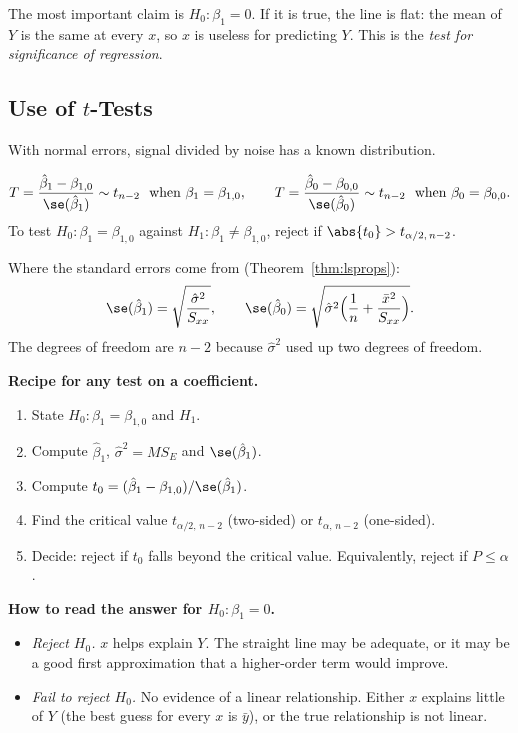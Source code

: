 The most important claim is $H_0:\beta_1=0$. If it is true, the line is flat: the mean of $Y$ is the same at every $x$, so $x$ is useless for predicting $Y$. This is the \emph{test for significance of regression}.

\subsection{Use of $t$-Tests}

With normal errors, signal divided by noise has a known distribution.

\begin{theorem}\label{thm:regt}
\[ T=\frac{\hat\beta_1-\beta_{1,0}}{\se(\hat\beta_1)}\sim t_{n-2}\ \text{ when }\beta_1=\beta_{1,0},\qquad T=\frac{\hat\beta_0-\beta_{0,0}}{\se(\hat\beta_0)}\sim t_{n-2}\ \text{ when }\beta_0=\beta_{0,0}. \]
To test $H_0:\beta_1=\beta_{1,0}$ against $H_1:\beta_1\ne\beta_{1,0}$, reject if $\abs{t_0}>t_{\alpha/2,\,n-2}$.
\end{theorem}

Where the standard errors come from (Theorem~\ref{thm:lsprops}):
\[ \se(\hat\beta_1)=\sqrt{\frac{\hat\sigma^2}{S_{xx}}},\qquad\se(\hat\beta_0)=\sqrt{\hat\sigma^2\Big(\frac1n+\frac{\bar{x}^2}{S_{xx}}\Big)}. \]
The degrees of freedom are $n-2$ because $\hat\sigma^2$ used up two degrees of freedom.

\textbf{Recipe for any test on a coefficient.}
\begin{enumerate}
  \item State $H_0:\beta_1=\beta_{1,0}$ and $H_1$.
  \item Compute $\hat\beta_1$, $\hat\sigma^2=MS_E$ and $\se(\hat\beta_1)$.
  \item Compute $t_0=(\hat\beta_1-\beta_{1,0})/\se(\hat\beta_1)$.
  \item Find the critical value $t_{\alpha/2,\,n-2}$ (two-sided) or $t_{\alpha,\,n-2}$ (one-sided).
  \item Decide: reject if $t_0$ falls beyond the critical value. Equivalently, reject if $P\le\alpha$.
\end{enumerate}

\textbf{How to read the answer for $H_0:\beta_1=0$.}
\begin{itemize}
  \item \emph{Reject $H_0$.} $x$ helps explain $Y$. The straight line may be adequate, or it may be a good first approximation that a higher-order term would improve.
  \item \emph{Fail to reject $H_0$.} No evidence of a linear relationship. Either $x$ explains little of $Y$ (the best guess for every $x$ is $\bar{y}$), or the true relationship is not linear.
\end{itemize}

